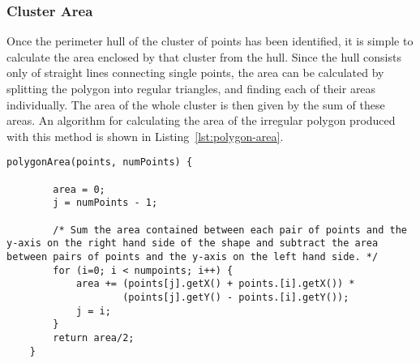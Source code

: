 \cite{lee2002polygonization}

\cite{estivill2000autoclust}

\cite{xia2006border}

\cite{lee1980two}

\subsubsection{Cluster Area}
\label{ssub:cluster_area_point}

Once the perimeter hull of the cluster of points has been identified, it is
simple to calculate the area enclosed by that cluster from the hull. Since the
hull consists only of straight lines connecting single points, the area can be
calculated by splitting the polygon into regular triangles, and finding each of
their areas individually. The area of the whole cluster is then given by the
sum of these areas. An algorithm for calculating the area of the irregular
polygon produced with this method is shown in Listing~\ref{lst:polygon-area}.

\begin{lstlisting}[caption={Code to find the area of an irregular polygon.
	Adapted from~\cite{finley2006poly}},
label=lst:polygon-area]
	polygonArea(points, numPoints) {

		area = 0;
		j = numPoints - 1;

		/* Sum the area contained between each pair of points and the y-axis on the right hand side of the shape and subtract the area between pairs of points and the y-axis on the left hand side. */
		for (i=0; i < numpoints; i++) {
			area += (points[j].getX() + points.[i].getX()) *
		        	(points[j].getY() - points.[i].getY());
			j = i;
		}
		return area/2;
	}
\end{lstlisting}
